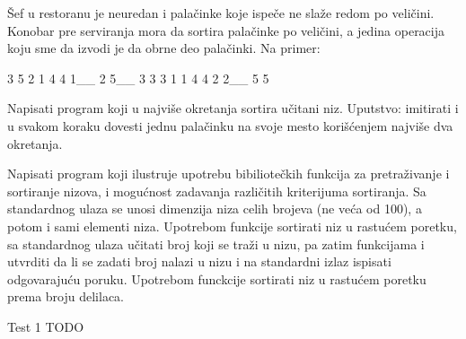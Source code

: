 \begin{Exercise}[label=516]
  Šef u restoranu je neuredan i palačinke koje ispeče ne slaže redom
  po veličini. Konobar pre serviranja mora da sortira palačinke po
  veličini, a jedina operacija koju sme da izvodi je da obrne deo
  palačinki. Na primer:
\begin{ckod}
    3    5    2    1
    4    4    1__  2
    5__  3    3    3
    1    1    4    4
    2    2__  5    5
\end{ckod}

Napisati program koji u najviše  okretanja sortira učitani
niz. Uputstvo: imitirati  i u svakom koraku dovesti
jednu palačinku na svoje mesto korišćenjem najviše dva okretanja.
    
\end{Exercise}

\begin{Exercise}[label=517]
  Napisati program koji ilustruje upotrebu bibiliotečkih funkcija za
  pretraživanje i sortiranje nizova, i mogućnost zadavanja različitih
  kriterijuma sortiranja. Sa standardnog ulaza se unosi dimenzija niza
  celih brojeva (ne veća od 100), a potom i sami elementi
  niza. Upotrebom funkcije  sortirati niz u rastućem
  poretku, sa standardnog ulaza učitati broj koji se traži u nizu, pa
  zatim funkcijama  i  utvrditi da li se zadati broj 
  nalazi u nizu i na standardni izlaz ispisati odgovarajuću poruku. 
  Upotrebom funckcije  sortirati niz u rastućem poretku prema broju delilaca.
  
\begin{miditest}
\begin{test}{Test 1}
TODO
\end{test}
\end{miditest}
  
\end{Exercise}

